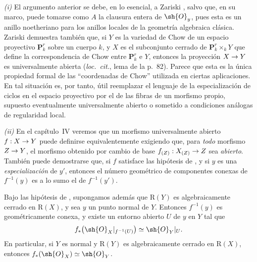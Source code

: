 \documentclass[oneside]{amsart}
\makeatletter
\newcommand{\ega@arrow}[2]{\mathchoice{#1}{#2}{#2}{#2}}
\renewcommand{\to}{\ega@arrow{\longrightarrow}{\rightarrow}}
\let\EGAOriginalLabel\label
\renewcommand{\label}[1]{\phantomsection\EGAOriginalLabel{#1}}
\makeatother
\begin{document}
\begin{remark}[4.3.11]
\label{III.4.3.11}
\emph{(i)}
El argumento anterior se debe, en lo esencial, a Zariski
\cite{I-20}, salvo que, en su marco, puede tomarse como $A$ la
clausura entera de $\sh{O}_y$, pues esta es un anillo noetheriano para
los anillos locales de la geometría algebraica clásica. Zariski
demuestra también que, si $Y$ es la variedad de Chow de un espacio
proyectivo $\mathbf{P}_k^r$ sobre un cuerpo $k$, y $X$ es el
subconjunto cerrado de $\mathbf{P}_k^r\times_kY$ que define la
correspondencia de Chow entre $\mathbf{P}_k^r$ e $Y$, entonces la
proyección $X\to Y$ es universalmente abierta (\emph{loc.\ cit.},
lema de la p.~82).
Parece que esta es la única propiedad formal de las ``coordenadas de
Chow'' utilizada en ciertas aplicaciones. En tal situación es, por
tanto, útil reemplazar el lenguaje de la especialización de ciclos en
el espacio proyectivo por el de las fibras de un morfismo propio,
supuesto eventualmente universalmente abierto o sometido a condiciones
análogas de regularidad local.

\emph{(ii)}
En el capítulo~IV veremos que un morfismo universalmente abierto
$f:X\to Y$ puede definirse equivalentemente exigiendo que, para \emph{todo}
morfismo $Z\to Y$, el morfismo obtenido por cambio de base
$f_{(Z)}:X_{(Z)}\to Z$ sea \emph{abierto}. También puede demostrarse que, si
$f$ satisface las hipótesis de , y si $y$ es una
\emph{especialización} de $y'$, entonces el número geométrico de componentes
conexas de $f^{-1}(y)$ es a lo sumo el de $f^{-1}(y')$.
\end{remark}

\begin{corollary}[4.3.12]
\label{III.4.3.12}
Bajo las hipótesis de \textup{}, supongamos además que
$\mathrm{R}(Y)$ es algebraicamente cerrado en $\mathrm{R}(X)$, y sea
$y$ un punto normal de $Y$. Entonces $f^{-1}(y)$ es geométricamente
conexa, y existe un entorno abierto $U$ de $y$ en $Y$ tal que
\[
  f_*\bigl(\sh{O}_X|_{f^{-1}(U)}\bigr)
  \simeq
  \sh{O}_Y|_U.
\]
En particular, si $Y$ es normal y $\mathrm{R}(Y)$ es algebraicamente
cerrado en $\mathrm{R}(X)$, entonces
$f_*(\sh{O}_X)\simeq\sh{O}_Y$.
\end{corollary}
\end{document}
